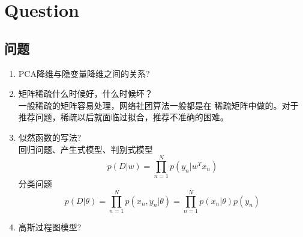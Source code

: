 \chapter{Question}
\section{问题}
\begin{enumerate}
\item PCA降维与隐变量降维之间的关系?\\
\item 矩阵稀疏什么时候好，什么时候坏？\\
一般稀疏的矩阵容易处理，网络社团算法一般都是在
稀疏矩阵中做的。对于推荐问题，稀疏以后就面临过拟合，推荐不准确的困难。
\item 似然函数的写法?\\
回归问题、产生式模型、判别式模型
\begin{equation}
p(D|w) = \prod^N_{n=1} p(y_n|w^Tx_n)
\end{equation}
分类问题
\begin{equation}
p(D|\theta) = \prod_{n=1}^N p(x_n, y_n|\theta)
= \prod_{n=1}^Np(x_n|\theta)p(y_n)
\end{equation}
\item 高斯过程图模型?\\
\end{enumerate}
